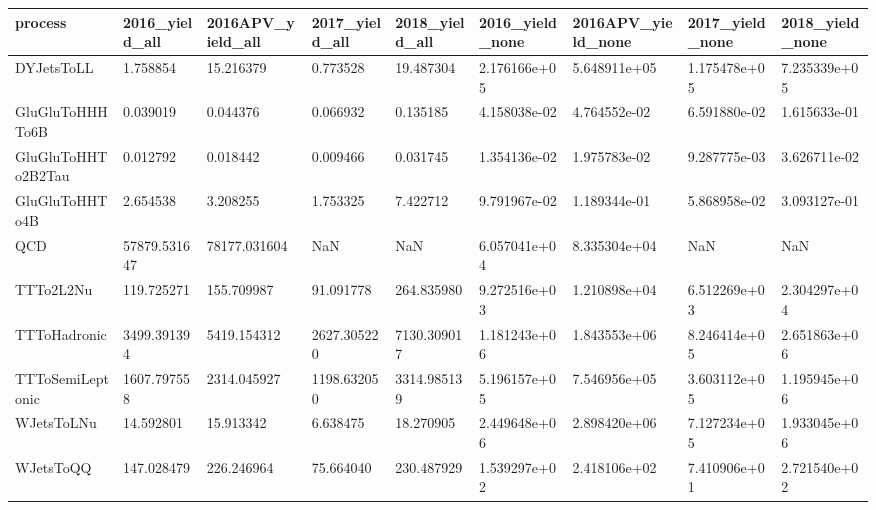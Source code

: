 \begin{tabular}{lllllllll}
\toprule
           process & 2016\_yield\_all & 2016APV\_yield\_all & 2017\_yield\_all & 2018\_yield\_all & 2016\_yield\_none & 2016APV\_yield\_none & 2017\_yield\_none & 2018\_yield\_none \\
\midrule
        DYJetsToLL &       1.758854 &         15.216379 &       0.773528 &      19.487304 &    2.176166e+05 &       5.648911e+05 &    1.175478e+05 &    7.235339e+05 \\
   GluGluToHHHTo6B &       0.039019 &          0.044376 &       0.066932 &       0.135185 &    4.158038e-02 &       4.764552e-02 &    6.591880e-02 &    1.615633e-01 \\
GluGluToHHTo2B2Tau &       0.012792 &          0.018442 &       0.009466 &       0.031745 &    1.354136e-02 &       1.975783e-02 &    9.287775e-03 &    3.626711e-02 \\
    GluGluToHHTo4B &       2.654538 &          3.208255 &       1.753325 &       7.422712 &    9.791967e-02 &       1.189344e-01 &    5.868958e-02 &    3.093127e-01 \\
               QCD &   57879.531647 &      78177.031604 &            NaN &            NaN &    6.057041e+04 &       8.335304e+04 &             NaN &             NaN \\
         TTTo2L2Nu &     119.725271 &        155.709987 &      91.091778 &     264.835980 &    9.272516e+03 &       1.210898e+04 &    6.512269e+03 &    2.304297e+04 \\
      TTToHadronic &    3499.391394 &       5419.154312 &    2627.305220 &    7130.309017 &    1.181243e+06 &       1.843553e+06 &    8.246414e+05 &    2.651863e+06 \\
  TTToSemiLeptonic &    1607.797558 &       2314.045927 &    1198.632050 &    3314.985139 &    5.196157e+05 &       7.546956e+05 &    3.603112e+05 &    1.195945e+06 \\
        WJetsToLNu &      14.592801 &         15.913342 &       6.638475 &      18.270905 &    2.449648e+06 &       2.898420e+06 &    7.127234e+05 &    1.933045e+06 \\
         WJetsToQQ &     147.028479 &        226.246964 &      75.664040 &     230.487929 &    1.539297e+02 &       2.418106e+02 &    7.410906e+01 &    2.721540e+02 \\
\bottomrule
\end{tabular}
